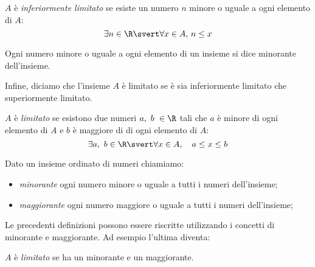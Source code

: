 \begin{newdef}{}{}
\(A\) è \emph{inferiormente limitato} se esiste un numero \(n\) 
minore o uguale a ogni elemento di \(A\):
\[\exists n \in \R \svert \forall x \in A,\, n \leq x\]
\end{newdef}

Ogni numero minore o uguale a ogni elemento di un insieme si dice minorante 
dell'insieme.


\vspace{.5em}
Infine, diciamo che l'insieme \(A\) è limitato se è sia inferiormente 
limitato che superiormente limitato.

\begin{newdef}{}{}
\(A\) è \emph{limitato} se esistono due numeri \(a,~b~ \in \R\) tali che 
\(a\) è minore di ogni elemento di \(A\) e \(b\) è maggiore di di ogni 
elemento di \(A\):
\[\exists a,~b \in \R \svert \forall x \in A,\quad a \leq x \leq b\]
\end{newdef}

\begin{newdef}{}{}
Dato un insieme ordinato di numeri chiamiamo:
\begin{itemize} [nosep]
\item \emph{minorante} ogni numero minore o uguale a tutti i numeri 
dell'insieme;
\item \emph{maggiorante} ogni numero maggiore o uguale a tutti i numeri 
dell'insieme;
\end{itemize}
\end{newdef}

Le precedenti definizioni possono essere riscritte utilizzando i concetti 
di minorante e maggiorante. 
Ad esempio l'ultima diventa:

\begin{newdef}{}{}
\(A\) è \emph{limitato} se ha un minorante e un maggiorante.
\end{newdef}

